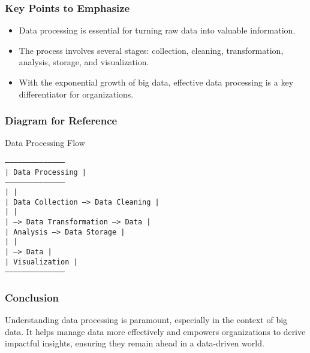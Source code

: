 \documentclass[aspectratio=169]{beamer}
\begin{document}
\begin{frame}[fragile]
    \frametitle{Key Points to Emphasize}
    \begin{itemize}
        \item Data processing is essential for turning raw data into valuable information.
        \item The process involves several stages: collection, cleaning, transformation, analysis, storage, and visualization.
        \item With the exponential growth of big data, effective data processing is a key differentiator for organizations.
    \end{itemize}
\end{frame}

\begin{frame}[fragile]
    \frametitle{Diagram for Reference}
    \begin{block}{Data Processing Flow}
        \begin{center}
            \texttt{-----------------------------------------} \\
            \texttt{|               Data Processing        |} \\
            \texttt{-----------------------------------------} \\
            \texttt{|                                     |} \\
            \texttt{|    Data Collection --> Data Cleaning |} \\
            \texttt{|                                     |} \\
            \texttt{| --> Data Transformation --> Data   |} \\
            \texttt{|     Analysis --> Data Storage      |} \\
            \texttt{|                                     |} \\
            \texttt{|                      --> Data       |} \\
            \texttt{|                         Visualization |} \\
            \texttt{-----------------------------------------}
        \end{center}
    \end{block}
\end{frame}

\begin{frame}[fragile]
    \frametitle{Conclusion}
    Understanding data processing is paramount, especially in the context of big data. 
    It helps manage data more effectively and empowers organizations to derive impactful insights, ensuring they remain ahead in a data-driven world.
\end{frame}
\end{document}
